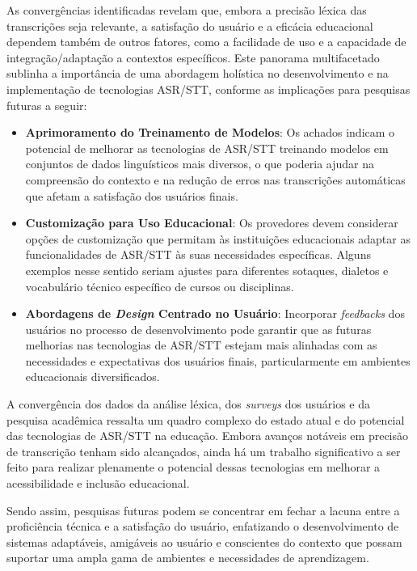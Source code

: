 As convergências identificadas revelam que, embora a precisão léxica das transcrições seja relevante, a satisfação do usuário e a eficácia educacional dependem também de outros fatores, como a facilidade de uso e a capacidade de integração/adaptação a contextos específicos. Este panorama multifacetado sublinha a importância de uma abordagem holística no desenvolvimento e na implementação de tecnologias ASR/STT, conforme as implicações para pesquisas futuras a seguir:

\begin{itemize}
\item \textbf{Aprimoramento do Treinamento de Modelos}: Os achados indicam o potencial de melhorar as tecnologias de ASR/STT treinando modelos em conjuntos de dados linguísticos mais diversos, o que poderia ajudar na compreensão do contexto e na redução de erros nas transcrições automáticas que afetam a satisfação dos usuários finais.

\item \textbf{Customização para Uso Educacional}: Os provedores devem considerar opções de customização que permitam às instituições educacionais adaptar as funcionalidades de ASR/STT às suas necessidades específicas. Alguns exemplos nesse sentido seriam ajustes para diferentes sotaques, dialetos e vocabulário técnico específico de cursos ou disciplinas.

\item \textbf{Abordagens de \textit{Design} Centrado no Usuário}: Incorporar \textit{feedbacks} dos usuários no processo de desenvolvimento pode garantir que as futuras melhorias nas tecnologias de ASR/STT estejam mais alinhadas com as necessidades e expectativas dos usuários finais, particularmente em ambientes educacionais diversificados.

\end{itemize}

A convergência dos dados da análise léxica, dos \textit{surveys} dos usuários e da pesquisa acadêmica ressalta um quadro complexo do estado atual e do potencial das tecnologias de ASR/STT na educação. Embora avanços notáveis em precisão de transcrição tenham sido alcançados, ainda há um trabalho significativo a ser feito para realizar plenamente o potencial dessas tecnologias em melhorar a acessibilidade e inclusão educacional.

Sendo assim, pesquisas futuras podem se concentrar em fechar a lacuna entre a proficiência técnica e a satisfação do usuário, enfatizando o desenvolvimento de sistemas adaptáveis, amigáveis ao usuário e conscientes do contexto que possam suportar uma ampla gama de ambientes e necessidades de aprendizagem.


